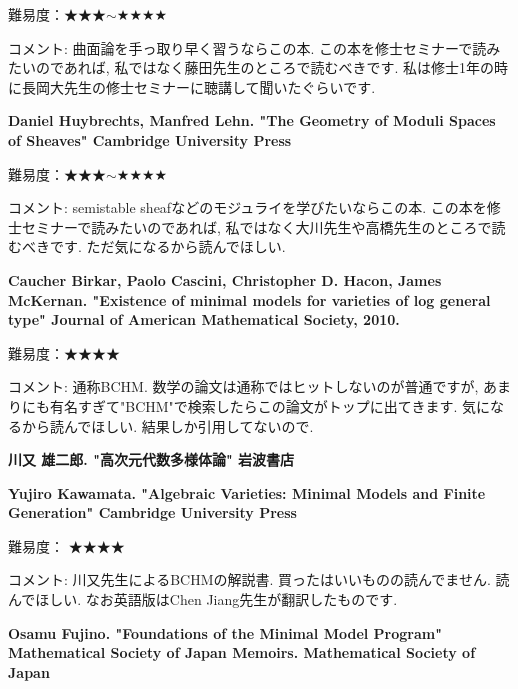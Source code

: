 難易度：★★★$\sim$★★★★\vspace{-6pt} 

コメント: 曲面論を手っ取り早く習うならこの本. この本を修士セミナーで読みたいのであれば, 私ではなく藤田先生のところで読むべきです. 私は修士1年の時に長岡大先生の修士セミナーに聴講して聞いたぐらいです. 
\vspace{8pt}

\textbf{Daniel Huybrechts, Manfred Lehn. "The Geometry of Moduli Spaces of Sheaves" Cambridge University Press} \vspace{-6pt}

難易度：★★★$\sim$★★★★\vspace{-6pt} 

コメント: semistable sheafなどのモジュライを学びたいならこの本. この本を修士セミナーで読みたいのであれば, 私ではなく大川先生や高橋先生のところで読むべきです. ただ気になるから読んでほしい.
 \vspace{8pt}
 
 \textbf{Caucher Birkar, Paolo Cascini, Christopher D. Hacon, James McKernan. "Existence of minimal models for varieties of log general type" Journal of American Mathematical Society, 2010.} \vspace{-6pt}

難易度：★★★★\vspace{-6pt} 

コメント: 通称BCHM. 数学の論文は通称ではヒットしないのが普通ですが, あまりにも有名すぎて"BCHM"で検索したらこの論文がトップに出てきます. 気になるから読んでほしい. 結果しか引用してないので. 
\vspace{8pt}

\textbf{川又 雄二郎. "高次元代数多様体論" 岩波書店} \vspace{-6pt}

\textbf{Yujiro Kawamata. "Algebraic Varieties: Minimal Models and Finite Generation" Cambridge University Press} \vspace{-6pt}

難易度： ★★★★\vspace{-6pt} 

コメント: 川又先生によるBCHMの解説書. 買ったはいいものの読んでません. 読んでほしい.
なお英語版はChen Jiang先生が翻訳したものです. 
\vspace{8pt}


\textbf{Osamu Fujino. "Foundations of the Minimal Model Program" Mathematical Society of Japan Memoirs. Mathematical Society of Japan} \vspace{-6pt}

